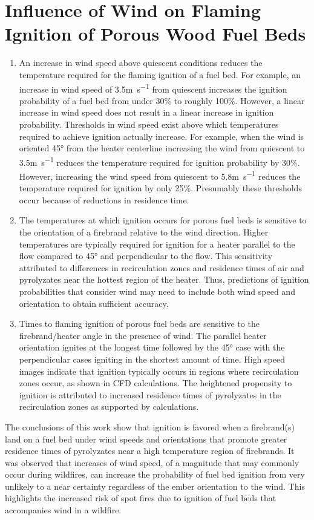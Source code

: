 \section{Influence of Wind on Flaming Ignition of Porous Wood Fuel Beds}
        \begin{enumerate}
            \item
            An increase in wind speed above quiescent conditions reduces the temperature required for the flaming ignition of a fuel bed. For example, an increase in wind speed of 3.5\si{\meter\per\second} from quiescent increases the ignition probability of a fuel bed from under 30\% to roughly 100\%. However, a linear increase in wind speed does not result in a linear increase in ignition probability. Thresholds in wind speed exist above which temperatures required to achieve ignition actually increase. For example, when the wind is oriented 45\si{\degree} from the heater centerline increasing the wind from quiescent to 3.5\si{\meter\per\second} reduces the temperature required for ignition probability by 30\%. However, increasing the wind speed from quiescent to 5.8\si{\meter\per\second} reduces the temperature required for ignition by only 25\%. Presumably these thresholds occur because of reductions in residence time. 
            
            \item The temperatures at which ignition occurs for porous fuel beds is sensitive to the orientation of a firebrand relative to the wind direction. Higher temperatures are typically required for ignition for a heater parallel to the flow compared to 45\si{\degree} and perpendicular to the flow. This sensitivity attributed to differences in recirculation zones and residence times of air and pyrolyzates near the hottest region of the heater. Thus, predictions of ignition probabilities that consider wind may need to include both wind speed and orientation to obtain sufficient accuracy.
            
            \item Times to flaming ignition of porous fuel beds are sensitive to the firebrand/heater angle in the presence of wind.
            The parallel heater orientation ignites at the longest time followed by the 45\si{\degree} case with the perpendicular cases igniting in the shortest amount of time. High speed images indicate that ignition typically occurs in regions where recirculation zones occur, as shown in CFD calculations. The heightened propensity to ignition is attributed to increased residence times of pyrolyzates in the recirculation zones as supported by calculations.
        \end{enumerate}
    The conclusions of this work show that ignition is favored when a firebrand(s) land on a fuel bed under wind speeds and orientations that promote greater residence times of pyrolyzates near a high temperature region of firebrands. It was observed that increases of wind speed, of a magnitude that may commonly occur during wildfires, can increase the probability of fuel bed ignition from very unlikely to a near certainty regardless of the ember orientation to the wind. This highlights the increased risk of spot fires due to ignition of fuel beds that accompanies wind in a wildfire. 


